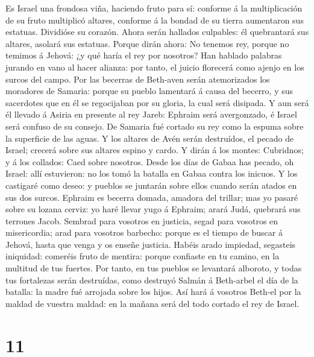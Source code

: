  Es Israel una frondosa viña, haciendo fruto para sí:
conforme á la multiplicación de su fruto multiplicó altares, conforme á
la bondad de su tierra aumentaron sus estatuas.  Dividióse
su corazón. Ahora serán hallados culpables: él quebrantará sus altares,
asolará sus estatuas.  Porque dirán ahora: No tenemos rey,
porque no temimos á Jehová: ¿y qué haría el rey por nosotros?
 Han hablado palabras jurando en vano al hacer alianza:
por tanto, el juicio florecerá como ajenjo en los surcos del campo.
 Por las becerras de Beth-aven serán atemorizados los
moradores de Samaria: porque su pueblo lamentará á causa del becerro, y
sus sacerdotes que en él se regocijaban por su gloria, la cual será
disipada.  Y aun será él llevado á Asiria en presente al
rey Jareb: Ephraim será avergonzado, é Israel será confuso de su
consejo.  De Samaria fué cortado su rey como la espuma
sobre la superficie de las aguas.  Y los altares de Avén
serán destruídos, el pecado de Israel; crecerá sobre sus altares espino
y cardo. Y dirán á los montes: Cubridnos; y á los collados: Caed sobre
nosotros.  Desde los días de Gabaa has pecado, oh Israel:
allí estuvieron: no los tomó la batalla en Gabaa contra los inicuos.
 Y los castigaré como deseo: y pueblos se juntarán sobre
ellos cuando serán atados en sus dos surcos.  Ephraim es
becerra domada, amadora del trillar; mas yo pasaré sobre su lozana
cerviz: yo haré llevar yugo á Ephraim; arará Judá, quebrará sus terrones
Jacob.  Sembrad para vosotros en justicia, segad para
vosotros en misericordia; arad para vosotros barbecho: porque es el
tiempo de buscar á Jehová, hasta que venga y os enseñe justicia.
 Habéis arado impiedad, segasteis iniquidad: comeréis
fruto de mentira: porque confiaste en tu camino, en la multitud de tus
fuertes.  Por tanto, en tus pueblos se levantará
alboroto, y todas tus fortalezas serán destruídas, como destruyó Salmán
á Beth-arbel el día de la batalla: la madre fué arrojada sobre los
hijos.  Así hará á vosotros Beth-el por la maldad de
vuestra maldad: en la mañana será del todo cortado el rey de Israel.

\hypertarget{section-10}{%
\section{11}\label{section-10}}

